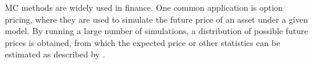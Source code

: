 \gls{MC} methods are widely used in finance. One common application is option pricing, where they are used to simulate the future price of an asset under a given model. By running a large number of simulations, a distribution of possible future prices is obtained, from which the expected price or other statistics can be estimated as described by \citet[p.~105]{KellyConall2024CaSf}.







